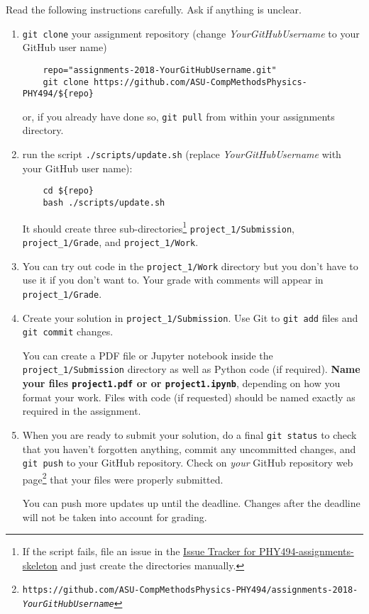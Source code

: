 \documentclass[letterpaper]{scrartcl}
\newcommand{\anumber}{1}
\newcommand{\anum}{\anumber}
\begin{document}
\noindent
Read the following instructions carefully. Ask if anything is unclear.
\begin{enumerate}
\item \texttt{git clone} your assignment repository (change
  \emph{YourGitHubUsername} to your GitHub user name)
  \begin{verbatim}
    repo="assignments-2018-YourGitHubUsername.git" 
    git clone https://github.com/ASU-CompMethodsPhysics-PHY494/${repo}
  \end{verbatim}
  or, if you already have done so, \texttt{git pull} from
  within your assignments directory.
\item run the script
  \texttt{./scripts/update.sh} (replace \emph{YourGitHubUsername} with
  your GitHub user name):
  \begin{verbatim}
    cd ${repo} 
    bash ./scripts/update.sh
  \end{verbatim}
  It should create three sub-directories\footnote{If the script fails,
    file an issue in the
    \href{https://github.com/ASU-CompMethodsPhysics-PHY494/PHY494-assignments-skeleton/issues}{Issue
      Tracker for PHY494-assignments-skeleton} and just create the
    directories manually.} \texttt{project\_\anum/Submission},
  \texttt{project\_\anum/Grade}, and
  \texttt{project\_\anum/Work}.
\item You can try out code in the \texttt{project\_\anum/Work}
  directory but you don't have to use it if you don't want to. Your
  grade with comments will appear in
  \texttt{project\_\anum/Grade}.
\item Create your solution in
  \texttt{project\_\anum/Submission}. Use Git to \texttt{git
    add} files and \texttt{git commit} changes.

  You can create a PDF file or Jupyter notebook inside the
  \texttt{project\_\anum/Submission} directory as well as Python
  code (if required). \textbf{Name your files \texttt{project\anum.pdf} or
    or \texttt{project\anum.ipynb}}, depending on how
  you format your work. Files with code (if requested) should be named
  exactly as required in the assignment.
\item When you are ready to submit your solution, do a final
  \texttt{git status} to check that you haven't forgotten anything,
  commit any uncommitted changes, and \texttt{git push} to your GitHub
  repository. Check on \emph{your} GitHub repository web
  page\footnote{\texttt{https://github.com/ASU-CompMethodsPhysics-PHY494/assignments-2018-\emph{YourGitHubUsername}}}
  that your files were properly submitted.

  You can push more updates up until the deadline. Changes after the
  deadline will not be taken into account for grading.
\end{enumerate}
\end{document}
